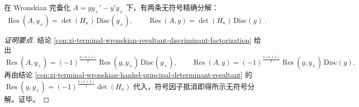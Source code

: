\begin{conclusion}\label{con:xi-terminal-wronskian-hankel-discriminant-signfree-factorization}
在 Wronskian 完备化 \(A=yy_{+}'-y'y_{+}\) 下，有两条无符号精确分解：
\[
\boxed{\;
\operatorname{Res}(A,y_{+})=\det(H_{\kappa})\,\mathrm{Disc}(y_{+}),
\qquad
\operatorname{Res}(A,y)=\det(H_{\kappa})\,\mathrm{Disc}(y)\; }.
\]
\end{conclusion}
\begin{proof}[证明要点]
结论 \ref{con:xi-terminal-wronskian-resultant-discriminant-factorization} 给出
\[
\operatorname{Res}(A,y_{+})
=(-1)^{\frac{\kappa(\kappa+1)}{2}}\operatorname{Res}(y,y_{+})\,\mathrm{Disc}(y_{+}),
\qquad
\operatorname{Res}(A,y)
=(-1)^{\frac{\kappa(\kappa+1)}{2}}\operatorname{Res}(y,y_{+})\,\mathrm{Disc}(y).
\]
再由结论 \ref{con:xi-terminal-wronskian-hankel-principal-determinant-resultant} 的
\(
\operatorname{Res}(y,y_{+})=(-1)^{\frac{\kappa(\kappa+1)}{2}}\det(H_{\kappa})
\)
代入，符号因子抵消即得所示无符号分解。证毕。
\end{proof}

\endinput
